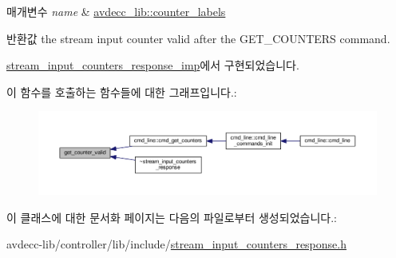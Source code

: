 \begin{DoxyParams}{매개변수}
{\em name} & \hyperlink{namespaceavdecc__lib_a831be56dba8ac423258a9374a1202df4}{avdecc\+\_\+lib\+::counter\+\_\+labels}\\
\hline
\end{DoxyParams}
\begin{DoxyReturn}{반환값}
the stream input counter valid after the G\+E\+T\+\_\+\+C\+O\+U\+N\+T\+E\+RS command. 
\end{DoxyReturn}


\hyperlink{classavdecc__lib_1_1stream__input__counters__response__imp_a192c298bbf4dbeef7d3d88d892732455}{stream\+\_\+input\+\_\+counters\+\_\+response\+\_\+imp}에서 구현되었습니다.



이 함수를 호출하는 함수들에 대한 그래프입니다.\+:
\nopagebreak
\begin{figure}[H]
\begin{center}
\leavevmode
\includegraphics[width=350pt]{classavdecc__lib_1_1stream__input__counters__response_a1a714d004a3ca8b521311ba4d3e62e93_icgraph}
\end{center}
\end{figure}




이 클래스에 대한 문서화 페이지는 다음의 파일로부터 생성되었습니다.\+:\begin{DoxyCompactItemize}
\item 
avdecc-\/lib/controller/lib/include/\hyperlink{stream__input__counters__response_8h}{stream\+\_\+input\+\_\+counters\+\_\+response.\+h}\end{DoxyCompactItemize}
